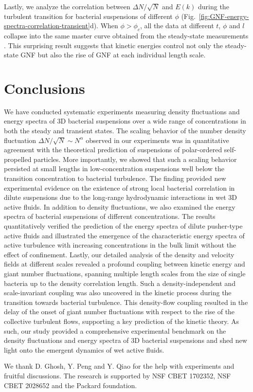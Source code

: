 \documentclass[twocolumn,aps,prx,amsmath,amssymb,longbibliography]{revtex4-2}
\begin{document}
Lastly, we analyze the correlation between $\Delta N/\sqrt N$ and $E(k)$ during the turbulent transition for bacterial suspensions of different $\phi$ (Fig.~\ref{fig:GNF-energy-spectra-correlation-transient}d). When $\phi>\phi_c$, all the data at different $t$, $\phi$ and $l$ collapse into the same master curve obtained from the steady-state measurements \cite{Liu2020}.
This surprising result suggests that kinetic energies control not only the steady-state GNF but also the rise of GNF at each individual length scale.

\section{Conclusions}

We have conducted systematic experiments measuring density fluctuations and energy spectra of 3D bacterial suspensions over a wide range of concentrations in both the steady and transient states. The scaling behavior of the number density fluctuation $\Delta N/\sqrt N \sim N^\alpha$ observed in our experiments was in quantitative agreement with the theoretical prediction of suspensions of polar-ordered self-propelled particles. More importantly, we showed that such a scaling behavior persisted at small lengths in low-concentration suspensions well below the transition concentration to bacterial turbulence. The finding provided new experimental evidence on the existence of strong local bacterial correlation in dilute suspensions due to the long-range hydrodynamic interactions in wet 3D active fluids. In addition to density fluctuations, we also examined the energy spectra of bacterial suspensions of different concentrations. The results quantitatively verified the prediction of the energy spectra of dilute pusher-type active fluids and illustrated the emergence of the characteristic energy spectra of active turbulence with increasing concentrations in the bulk limit without the effect of confinement. Lastly, our detailed analysis of the density and velocity fields at different scales revealed a profound coupling between kinetic energy and giant number fluctuations, spanning multiple length scales from the size of single bacteria up to the density correlation length. Such a density-independent and scale-invariant coupling was also uncovered in the kinetic process during the transition towards bacterial turbulence. This density-flow coupling resulted in the delay of the onset of giant number fluctuations with respect to the rise of the collective turbulent flows, supporting a key prediction of the kinetic theory. As such, our study provided a comprehensive experimental benchmark on the density fluctuations and energy spectra of 3D bacterial suspensions and shed new light onto the emergent dynamics of wet active fluids. \\

\begin{acknowledgements}
	We thank D. Ghosh, Y. Peng and Y. Qiao for the help with experiments and fruitful discussions. The research is supported by NSF CBET 1702352, NSF CBET 2028652 and the Packard foundation.
\end{acknowledgements}



\end{document}
